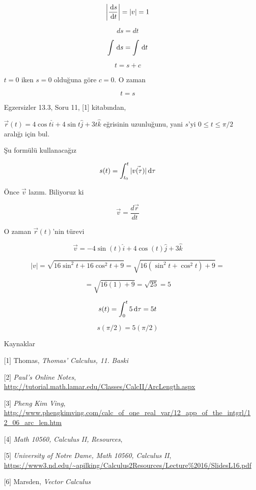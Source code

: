 \documentclass[12pt,fleqn]{article}\usepackage{../../common}
\begin{document}
$$ \bigg|\frac{\,\mathrm{d} s}{\,\mathrm{d} t}\bigg| = |v| = 1 $$

$$ ds = dt $$

$$ \int \,\mathrm{d} s = \int \,\mathrm{d} t $$

$$ t = s + c $$

$t=0$ iken $s=0$ olduğuna göre $c=0$. O zaman 

$$ t = s $$

Egzersizler 13.3, Soru 11, [1] kitabından,

$\vec{r}(t) = 4 \cos t \hat{i} + 4 \sin t \hat{j} + 3t \hat{k}$ 
eğrisinin uzunluğunu, yani $s$'yi  $ 0 \le t \le \pi / 2$ 
aralığı için bul. 

Şu formülü kullanacağız

$$ s(t) = \int_{t_0}^t |\vec{v(\tau)}| \,\mathrm{d}\tau  $$

Önce $\vec{v}$ lazım. Biliyoruz ki

$$ \vec{v} = \frac{d\vec{r}}{dt} $$

O zaman $\vec{r}(t)$'nin türevi

$$ \vec{v} = -4\sin(t)\hat{i} + 4\cos(t)\hat{j} + 3\hat{k} $$

$$ |v| = \sqrt{16\sin^2t + 16\cos^2t  + 9} = 
\sqrt{16(\sin^2t + \cos^2t) + 9} = 
 $$

$$ = \sqrt{16(1) + 9} = \sqrt{25} = 5 $$

$$ s(t) = \int_0^t 5 \,\mathrm{d} \tau = 
5t 
$$

$$ s(\pi / 2) = 5(\pi/2) $$

Kaynaklar

[1] Thomas, {\em Thomas' Calculus, 11. Baski}

[2] {\em Paul's Online Notes},
    \url{http://tutorial.math.lamar.edu/Classes/CalcII/ArcLength.aspx}

[3] {\em Pheng Kim Ving},
    \url{http://www.phengkimving.com/calc_of_one_real_var/12_app_of_the_intgrl/12_06_arc_len.htm}

[4] {\em Math 10560, Calculus II, Resources}, 
    
[5] {\em University of Notre Dame, Math 10560, Calculus II},
    \url{https://www3.nd.edu/~apilking/Calculus2Resources/Lecture%2016/SlidesL16.pdf}

[6] Marsden, {\em Vector Calculus}
      
\end{document}
